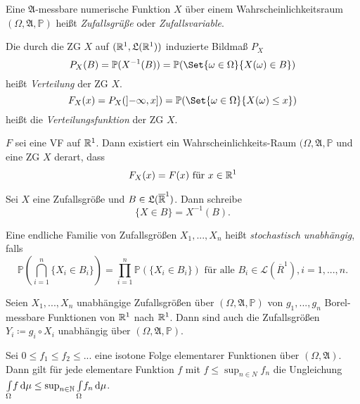 \documentclass{cheat-sheet}
\newcommand{\Alg}{\mathfrak{A}}
\newcommand{\LebAlg}{\mathfrak{L}} %
\renewcommand{\P}{\mathbb{P}}
\begin{document}
\begin{defn}
  Eine $\Alg$-messbare numerische Funktion $X$ über einem Wahrscheinlichkeitsraum $(\Omega, \Alg, \P)$ heißt \emph{Zufallsgrüße} oder \emph{Zufallsvariable}.
\end{defn}

\begin{defn}
  Die durch die ZG $X$ auf $(\R^1, \LebAlg(\R^1))$ induzierte Bildmaß $P_X$
  \[ P_X(B) = \P(X^{-1}(B)) = \P(\Set{ \omega \in \Omega  }{ X(\omega) \in B }) \]
  heißt \emph{Verteilung} der ZG $X$.
  \[ F_X(x) = P_X(\left]-\infty, x\right]) = \P(\Set{ \omega \in \Omega }{ X(\omega) \leq x }) \]
  heißt die \emph{Verteilungsfunktion} der ZG $X$.
\end{defn}

\begin{satz}
  $F$ sei eine VF auf $\mathbb{R}^1$. Dann existiert ein Wahrscheinlichkeits-Raum $(\Omega, \Alg, \P$ und eine ZG $X$ derart, dass
  \[ F_X(x) = F(x) \text{ für } x \in \mathbb{R}^1 \]
\end{satz}

\begin{nota}
  Sei $X$ eine Zufallsgröße und $B \in \LebAlg(\overline{\R}^1)$. Dann schreibe
  \[ \{ X \in B \} = X^{-1}(B). \]
\end{nota}

\begin{defn}
  Eine endliche Familie von Zufallsgrößen $X_1, ..., X_n$ heißt \emph{stochastisch unabhängig}, falls
  \[ \P(\bigcap_{i=1}^n \{ X_i \in B_i \}) = \prod_{i=1}^n \P(\{ X_i \in B_i \}) \text{ für alle } B_i \in \mathcal{L}(\overline{R}^1), i = 1, ..., n. \]
\end{defn}

\begin{satz}
  Seien $X_1, ..., X_n$ unabhängige Zufallsgrößen über $(\Omega, \Alg, \P)$ von $g_1, ..., g_n$ Borel-messbare Funktionen von $\mathbb{R}^1$ nach $\mathbb{R}^1$. Dann sind auch die Zufallsgrößen $Y_i \coloneqq g_i \circ X_i$ unabhängig über $(\Omega, \Alg, \P)$.
\end{satz}



\begin{satz}
  Sei $0 \leq f_1 \leq f_2 \leq ...$ eine isotone Folge elementarer Funktionen über $(\Omega, \Alg)$. Dann gilt für jede elementare Funktion $f$ mit $f \leq \sup_{n \in N} f_n$ die Ungleichung ${\textstyle \int\limits_{\Omega}^{}} f \,\mathrm{d} \mu \leq \sup_{n \in \mathbb{N}} {\textstyle \int\limits_{\Omega}^{}} f_n \,\mathrm{d} \mu$.
\end{satz}
\end{document}
